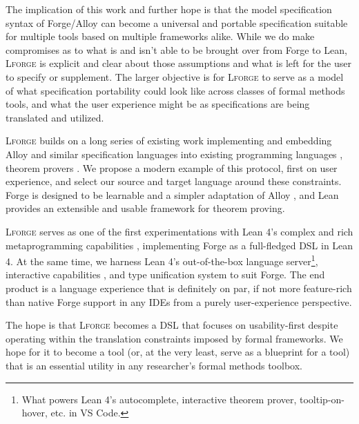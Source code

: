 The implication of this work and further hope is that the model specification syntax of Forge/Alloy can become a universal and portable specification suitable for multiple tools based on multiple frameworks alike. While we do make compromises as to what is and isn't able to be brought over from Forge to Lean, \textsc{Lforge} is explicit and clear about those assumptions and what is left for the user to specify or supplement. The larger objective is for \textsc{Lforge} to serve as a model of what specification portability could look like across classes of formal methods tools, and what the user experience might be as specifications are being translated and utilized. 

\textsc{Lforge} builds on a long series of existing work implementing and embedding Alloy and similar specification languages into existing programming languages \cite{milicevic2010executable,milicevic2014alpha,korner2022embedding,malik2010translating,mikhailov2002approach}, theorem provers \cite{arkoudas2004integrating,st2023comparison,krings2018translation}. We propose a modern example of this protocol, first on user experience, and select our source and target language around these constraints. Forge is designed to be learnable and a simpler adaptation of Alloy \cite{ngpdbccdlrrvwwk-oopsla-2024}, and Lean provides an extensible \cite{nawrocki2023extensible,ullrich2023extensible} and usable \cite{ayers2021graphical} framework for theorem proving. 

\textsc{Lforge} serves as one of the first experimentations with Lean 4's complex and rich metaprogramming capabilities \cite{metaprogramming}, implementing Forge as a full-fledged DSL in Lean 4. At the same time, we harness Lean 4's out-of-the-box language server\footnote{What powers Lean 4's autocomplete, interactive theorem prover, tooltip-on-hover, etc. in VS Code.}, interactive capabilities \cite{nawrocki2023extensible}, and type unification system to suit Forge. The end product is a language experience that is definitely on par, if not more feature-rich than native Forge support in any IDEs from a purely user-experience perspective. 

The hope is that \textsc{Lforge} becomes a DSL that focuses on usability-first despite operating within the translation constraints imposed by formal frameworks. We hope for it to become a tool (or, at the very least, serve as a blueprint for a tool) that is an essential utility in any researcher's formal methods toolbox. 
